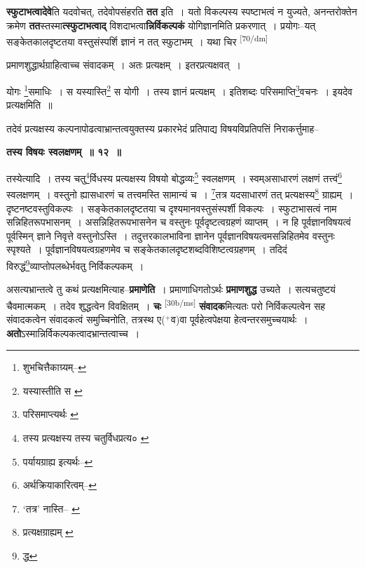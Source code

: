 \documentclass[article,12pt,a4paper]{memoir}
\newcommand{\add}[1]{($^{+}$#1)}
\begin{document}
	  \pstart \textbf{स्फुटाभत्वादेवे}ति यदवोचत्, तदेवोपसंहरति \textbf{तत} इति । यतो विकल्पस्य स्पष्टाभत्वं न युज्यते, अनन्तरोक्तेन क्रमेण \textbf{तत}स्तस्मा\textbf{त्स्फुटाभत्वाद्} विशदाभत्वा\textbf{न्निर्विकल्पकं} योगिज्ञानमिति प्रकरणात् । प्रयोगः--यत् सङ्केतकालदृष्टतया वस्तुसंस्पर्शि ज्ञानं न तत् स्फुटाभम् । यथा चिर \leavevmode\textsuperscript{\rmlatinfont\tiny [70/dm]} 
	  
	प्रमाणशुद्धार्थग्राहित्वाच्च संवादकम् । अतः प्रत्यक्षम् । इतरप्रत्यक्षवत् । 
	  
	योगः \footnote{शुभचित्तैकाग्र्यम्--\cite{dp-msD-n}}समाधिः । स यस्यास्ति\footnote{यस्यास्तीति स \cite{dp-msC}} स योगी । तस्य ज्ञानं प्रत्यक्षम् । इतिशब्दः परिसमाप्ति\footnote{परिसमाप्त्यर्थः \cite{dp-msA} \cite{dp-edP} \cite{dp-edH} \cite{dp-edE} \cite{dp-edN}}वचनः । इयदेव प्रत्यक्षमिति ॥ 
	  
	तदेवं प्रत्यक्षस्य कल्पनापोढत्वाभ्रान्तत्वयुक्तस्य प्रकारभेदं प्रतिपाद्य विषयविप्रतिपत्तिं निराकर्त्तुमाह-- 
	  
	\textbf{तस्य विषयः स्वलक्षणम् ॥ १२ ॥} 
	  
	तस्येत्यादि । तस्य चतु\footnote{तस्य प्रत्यक्षस्य \cite{dp-msC} तस्य चतुर्विधप्रत्य० \cite{dp-msA} \cite{dp-edP} \cite{dp-edH} \cite{dp-edE} \cite{dp-edN}}र्विधस्य प्रत्यक्षस्य विषयो बोद्धव्यः\footnote{पर्यायग्राह्य इत्यर्थः--\cite{dp-msD-n}} स्वलक्षणम् । स्वम्असाधारणं लक्षणं तत्त्वं\footnote{अर्थक्रियाकारित्वम्--\cite{dp-msD-n}} स्वलक्षणम् । वस्तुनो ह्यासधारणं च तत्त्वमस्ति सामान्यं च । \footnote{‘तत्र’ नास्ति--\cite{dp-msA} \cite{dp-msB} \cite{dp-msD} \cite{dp-edP} \cite{dp-edH} \cite{dp-edE}}तत्र यदसाधारणं तत् प्रत्यक्षस्य\footnote{प्रत्यक्षग्राह्यम् \cite{dp-msA} \cite{dp-msB} \cite{dp-edP} \cite{dp-edH} \cite{dp-edE}} ग्राह्यम् । दृष्टनष्टवस्तुविकल्पः । सङ्केतकालदृष्टतया च दृश्यमानवस्तुसंस्पर्शी विकल्पः । स्फुटाभासत्वं नाम सन्निहितरूपभासनम् । असन्निहितरूपभासनेन च वस्तुनः पूर्वदृष्टत्वग्रहणं व्याप्तम् । न हि पूर्वज्ञानविषयत्वं पूर्वस्मिन् ज्ञाने निवृत्ते वस्तुनोऽस्ति । तदुत्तरकालभाविना ज्ञानेन पूर्वज्ञानविषयत्वमसन्निहितमेव वस्तुनः स्पृश्यते । पूर्वज्ञानविषयत्वग्रहणमेव च सङ्केतकालदृष्टशब्दविशिष्टत्वग्रहणम् । तदिदं विरुद्धं\footnote{द्ध}व्याप्तोपलब्धेर्भवतु निर्विकल्पकम् ।
	\pend
      

	  \pstart असत्यभ्रान्तत्वे तु कथं प्रत्यक्षमित्याह--\textbf{प्रमाणेति} । प्रमाणाधिगतोऽर्थः \textbf{प्रमाणशुद्ध} उच्यते । सत्यचतुष्टयं चैवमात्मकम् । तदेव शुद्धत्वेन विवक्षितम् । \textbf{चः} \leavevmode\textsuperscript{\rmlatinfont\tiny [30b/ms]} \textbf{संवादक}मित्यतः परो निर्विकल्पत्वेन सह संवादकत्वेन संवादकत्वं समुच्चिनोति, तत्रस्थ ए\add{व}वा पूर्वहेत्वपेक्षया हेत्वन्तरसमुच्चयार्थः । \textbf{अतो}ऽस्मान्निर्विकल्पकत्वादभ्रान्तत्वाच्च ।
	\pend
      
\end{document}
